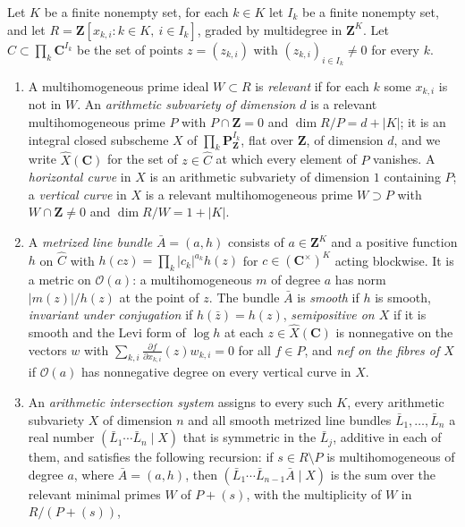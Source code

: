 \begin{definition}\label{lit-multiprojective}
Let $K$ be a finite nonempty set, for each $k\in K$ let $I_k$ be a finite
nonempty set, and let $R=\mathbf Z[x_{k,i}:k\in K,\ i\in I_k]$, graded by
multidegree in $\mathbf Z^K$. Let $\hat C\subset\prod_k\mathbf C^{I_k}$ be the
set of points $z=(z_{k,i})$ with $(z_{k,i})_{i\in I_k}\neq0$ for every $k$.
\begin{enumerate}
\item A multihomogeneous prime ideal $W\subset R$ is \emph{relevant} if for
  each $k$ some $x_{k,i}$ is not in $W$. An \emph{arithmetic subvariety of
  dimension $d$} is a relevant multihomogeneous prime $P$ with
  $P\cap\mathbf Z=0$ and $\dim R/P=d+|K|$; it is an integral closed subscheme
  $X$ of $\prod_k\mathbf P^{I_k}_{\mathbf Z}$, flat over $\mathbf Z$, of
  dimension $d$, and we write $\hat X(\mathbf C)$ for the set of
  $z\in\hat C$ at which every element of $P$ vanishes. A \emph{horizontal
  curve} in $X$ is an arithmetic subvariety of dimension $1$ containing $P$; a
  \emph{vertical curve} in $X$ is a relevant multihomogeneous prime
  $W\supset P$ with $W\cap\mathbf Z\neq0$ and $\dim R/W=1+|K|$.
\item A \emph{metrized line bundle} $\bar A=(a,h)$ consists of
  $a\in\mathbf Z^K$ and a positive function $h$ on $\hat C$ with
  $h(cz)=\prod_k|c_k|^{a_k}h(z)$ for $c\in(\mathbf C^\times)^K$ acting
  blockwise. It is a metric on $\mathcal O(a)$: a multihomogeneous $m$ of
  degree $a$ has norm $|m(z)|/h(z)$ at the point of $z$. The bundle $\bar A$ is
  \emph{smooth} if $h$ is smooth, \emph{invariant under conjugation} if
  $h(\bar z)=h(z)$, \emph{semipositive on $X$} if it is smooth and the Levi
  form of $\log h$ at each $z\in\hat X(\mathbf C)$ is nonnegative on the
  vectors $w$ with $\sum_{k,i}\frac{\partial f}{\partial x_{k,i}}(z)w_{k,i}=0$
  for all $f\in P$, and \emph{nef on the fibres of $X$} if $\mathcal O(a)$ has
  nonnegative degree on every vertical curve in $X$.
\item An \emph{arithmetic intersection system} assigns to every such $K$, every
  arithmetic subvariety $X$ of dimension $n$ and all smooth metrized line
  bundles $\bar L_1,\ldots,\bar L_n$ a real number
  $(\bar L_1\cdots\bar L_n\mid X)$ that is symmetric in the $\bar L_j$,
  additive in each of them, and satisfies the following recursion: if
  $s\in R\setminus P$ is multihomogeneous of degree $a$, where $\bar A=(a,h)$,
  then $(\bar L_1\cdots\bar L_{n-1}\bar A\mid X)$ is the sum over the relevant
  minimal primes $W$ of $P+(s)$, with the multiplicity of $W$ in $R/(P+(s))$,

\end{enumerate}
\end{definition}
